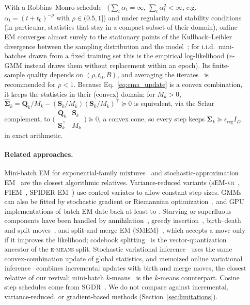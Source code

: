 \documentclass[10pt]{article} %
\newcommand{\egmm}{\textsc{e-GMM}}
\newcommand{\emeans}{\textsc{e-means}}
\begin{document}
With a Robbins--Monro schedule~\citep{robbins1951stochastic} ($\sum_t \alpha_t = \infty$, $\sum_t \alpha_t^2 < \infty$, e.g.\ $\alpha_t = (t + t_0)^{-\rho}$ with $\rho \in (0.5, 1]$) and under regularity and stability conditions (in particular, statistics that stay in a compact subset of their domain), online EM converges almost surely to the stationary points of the Kullback--Leibler divergence between the sampling distribution and the model~\citep{cappe2009online}; for i.i.d.\ mini-batches drawn from a fixed training set this is the empirical log-likelihood (\egmm{} instead draws them without replacement within an epoch). Its finite-sample quality depends on $(\rho, t_0, B)$, and averaging the iterates~\citep{polyak1992acceleration} is recommended for $\rho < 1$. Because Eq.~\eqref{eq:ema_update} is a convex combination, it keeps the statistics in their (convex) domain: for $M_k > 0$, $\hat{\boldsymbol{\Sigma}}_k = \mathbf{Q}_k / M_k - (\mathbf{S}_k / M_k)(\mathbf{S}_k / M_k)^\top \succeq 0$ is equivalent, via the Schur complement, to $\bigl(\begin{smallmatrix} \mathbf{Q}_k & \mathbf{S}_k \\ \mathbf{S}_k^\top & M_k \end{smallmatrix}\bigr) \succeq 0$, a convex cone, so every step keeps $\boldsymbol{\Sigma}_k \succeq \epsilon_{\mathrm{reg}} I_D$ in exact arithmetic.

\paragraph{Related approaches.} Mini-batch EM for exponential-family mixtures~\citep{nguyen2020minibatch} and stochastic-approximation EM~\citep{delyon1999saem} are the closest algorithmic relatives. Variance-reduced variants (\textsc{sEM-vr}~\citep{chen2018semvr}, \textsc{FIEM}~\citep{karimi2019fiem}, \textsc{SPIDER-EM}~\citep{fort2020spider}) use control variates to allow constant step sizes. GMMs can also be fitted by stochastic gradient or Riemannian optimization~\citep{hosseini2020alternative,gepperth2021gradient}, and GPU implementations of batch EM date back at least to \citet{kumar2009fast}. Starving or superfluous components have been handled by annihilation~\citep{figueiredo2002unsupervised}, greedy insertion~\citep{vlassis2002greedy,verbeek2003efficient}, birth--death and split moves~\citep{richardson1997bayesian,stephens2000bayesian,dellaportas2006multivariate}, and split-and-merge EM (SMEM)~\citep{ueda2000smem,zhang2003em}, which accepts a move only if it improves the likelihood; codebook splitting~\citep{linde1980algorithm} is the vector-quantization ancestor of the \emeans{} split. Stochastic variational inference~\citep{hoffman2013stochastic} uses the same convex-combination update of global statistics, and memoized online variational inference~\citep{hughes2013memoized} combines incremental updates with birth and merge moves, the closest relative of our revival; mini-batch $k$-means~\citep{sculley2010web} is the $k$-means counterpart. Cosine step schedules come from SGDR~\citep{loshchilov2017sgdr}. We do not compare against incremental, variance-reduced, or gradient-based methods (Section~\ref{sec:limitations}).
\end{document}
